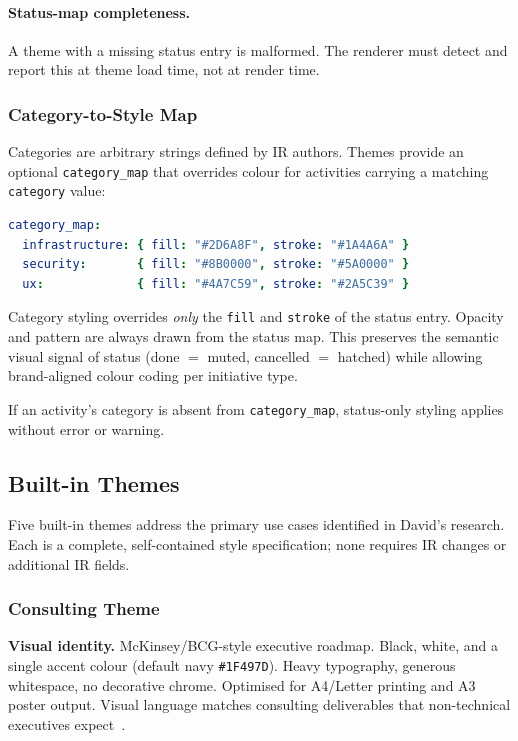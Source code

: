 \paragraph{Status-map completeness.}
A theme with a missing status entry is malformed. The renderer must detect and report this
at theme load time, not at render time.

\subsubsection{Category-to-Style Map}
\label{sec:category-style-map}

Categories are arbitrary strings defined by IR authors. Themes provide an optional
\texttt{category\_map} that overrides colour for activities carrying a matching
\texttt{category} value:

\begin{lstlisting}[language=yaml,caption={Category map example}]
category_map:
  infrastructure: { fill: "#2D6A8F", stroke: "#1A4A6A" }
  security:       { fill: "#8B0000", stroke: "#5A0000" }
  ux:             { fill: "#4A7C59", stroke: "#2A5C39" }
\end{lstlisting}

Category styling overrides \emph{only} the \texttt{fill} and \texttt{stroke} of the status
entry. Opacity and pattern are always drawn from the status map. This preserves the semantic
visual signal of status (done $=$ muted, cancelled $=$ hatched) while allowing brand-aligned
colour coding per initiative type.

If an activity's category is absent from \texttt{category\_map}, status-only styling applies
without error or warning.

\subsection{Built-in Themes}
\label{sec:builtin-themes}

Five built-in themes address the primary use cases identified in David's research. Each is a
complete, self-contained style specification; none requires IR changes or additional IR
fields.

\subsubsection{Consulting Theme}
\label{sec:theme-consulting}

\textbf{Visual identity.}
McKinsey/BCG-style executive roadmap. Black, white, and a single accent colour (default
navy \texttt{\#1F497D}). Heavy typography, generous whitespace, no decorative chrome.
Optimised for A4/Letter printing and A3 poster output. Visual language matches consulting
deliverables that non-technical executives expect~\cite{thinkcell}.


